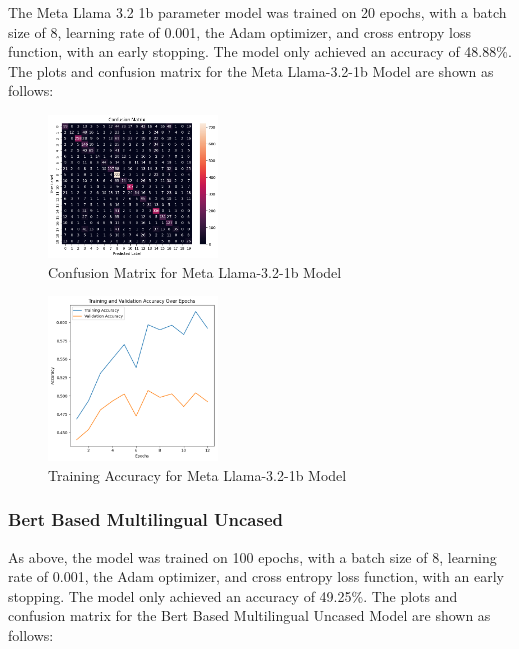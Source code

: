 The Meta Llama 3.2 1b parameter model was trained on 20 epochs, with a batch size of 8, learning rate of 0.001, the Adam optimizer, and cross entropy loss function, with an early stopping. The model only achieved an accuracy of 48.88\%. The plots and confusion matrix for the Meta Llama-3.2-1b Model are shown as follows:

\begin{figure}[H]
    \centering
    \includegraphics[width=0.4\textwidth]{llama_confmat.png}
    \caption{Confusion Matrix for Meta Llama-3.2-1b Model}
    \label{fig:llama_confmat}
\end{figure}

\begin{figure}[H]
    \centering
    \includegraphics[width=0.4\textwidth]{llama_trainaccuracy.png}
    \caption{Training Accuracy for Meta Llama-3.2-1b Model}
    \label{fig:llama_trainaccuracy}
\end{figure}


\subsubsection{Bert Based Multilingual Uncased}
As above, the model was trained on 100 epochs, with a batch size of 8, learning rate of 0.001, the Adam optimizer, and cross entropy loss function, with an early stopping. The model only achieved an accuracy of 49.25\%. The plots and confusion matrix for the Bert Based Multilingual Uncased Model are shown as follows:

